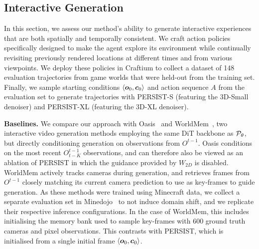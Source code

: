 \documentclass{article}
\theoremstyle{plain}
\theoremstyle{definition}
\theoremstyle{remark}
\begin{document}
\subsection{Interactive Generation}

In this section, we assess our method's ability to generate interactive experiences that are both spatially and temporally consistent. We craft action policies specifically designed to make the agent explore its environment while continually revisiting previously rendered locations at different times and from various viewpoints.
 We deploy these policies in Craftium to collect a dataset of 148 evaluation trajectories from game worlds that were held-out from the training set. Finally, we sample starting conditions $\langle {\bm{o}}_0, {\bm{c}}_0\rangle$ and action sequence $A$ from the evaluation set to generate trajectories with PERSIST-S (featuring the 3D-Small denoiser) and PERSIST-XL (featuring the 3D-XL denoiser).


\textbf{Baselines.} We compare our approach with Oasis~\citep{decart2024oasis} and WorldMem~\citep{xiao2025worldmemlongtermconsistentworld},  two interactive video generation methods employing the same DiT backbone as ${\mathcal{P}}_\theta$, but directly conditioning generation on observations from $O^{t-1}$.
Oasis conditions on the most recent $O^{t-1}_{t-K}$ observations, and can therefore also be viewed as an ablation of PERSIST in which the guidance provided by $W_{2D}$ is disabled.
WorldMem actively tracks cameras during generation, and retrieves frames from $O^{t-1}$ closely matching its current camera prediction to use as key-frames to guide generation.
As these methods were trained using Minecraft data, we collect a separate evaluation set in Minedojo~\citep{fan2022minedojo} to not induce domain shift, and we replicate their respective inference configurations.
In the case of WorldMem, this includes initialising the memory bank used to sample key-frames with 600 ground truth cameras and pixel observations.
This contrasts with PERSIST, which is initialised from a single initial frame $\langle {\bm{o}}_0, {\bm{c}}_0 \rangle$.
\end{document}
